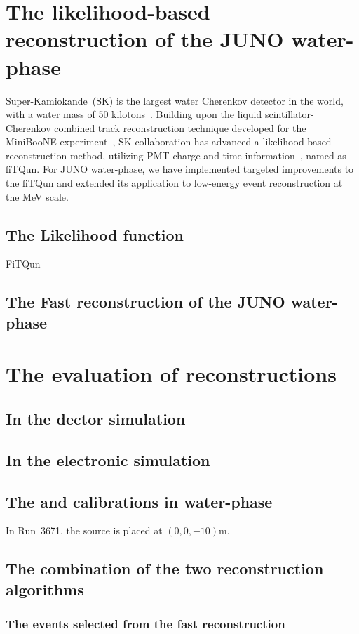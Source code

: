 
\section{The likelihood-based reconstruction of the JUNO water-phase}
Super-Kamiokande~(SK) is the largest water Cherenkov detector in the world, with a water mass of 50 kilotons~\cite{SK}.
Building upon the liquid scintillator-Cherenkov combined track reconstruction technique developed for the MiniBooNE experiment~\cite{minibone}, SK collaboration has advanced a likelihood-based reconstruction method, utilizing PMT charge and time information~\cite{SKfiTQun}, named as fiTQun.  For JUNO water-phase, we have implemented targeted improvements to the fiTQun and extended its application to low-energy event reconstruction at the MeV scale.
\subsection{The Likelihood function}
FiTQun
\subsection{The Fast reconstruction of the JUNO water-phase}
\section{The evaluation of reconstructions}
\subsection{In the dector simulation}
\subsection{In the electronic simulation}
\subsection{The  and  calibrations in water-phase}
In Run~3671, the  source is placed at $(0,0,-10)$\si{m}.

\subsection{The combination of the two reconstruction algorithms}
\subsubsection{The events selected from the fast reconstruction}
